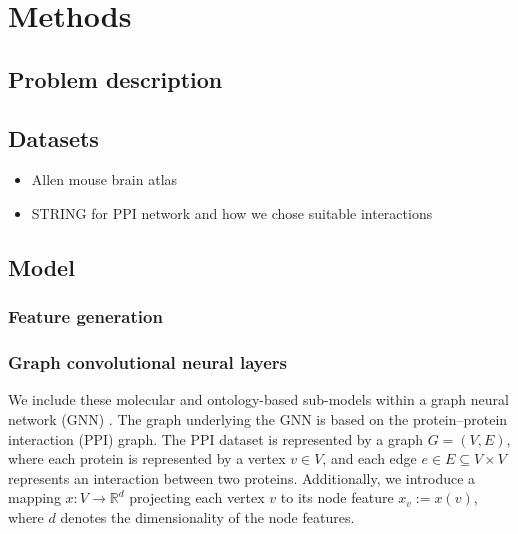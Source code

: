 \documentclass[]{article}
\renewcommand{\cite}{\citep}
\begin{document}
\section{Methods}
\subsection{Problem description}

\subsection{Datasets}
\begin{itemize}
	\item Allen mouse brain atlas \cite{MouseBrainAtlas}
	\item STRING for PPI network and how we chose suitable interactions \cite{STRINGv10}
\end{itemize}

\subsection{Model}

\subsubsection{Feature generation}

\subsubsection{Graph convolutional neural layers}

We include these molecular and ontology-based sub-models within a
graph neural network (GNN) \cite{GCNConv}. The graph underlying the GNN is
based on the protein--protein interaction (PPI) graph. The PPI dataset
is represented by a graph $G=(V,E)$, where each protein is represented
by a vertex $v\in V$, and each edge $e\in E\subseteq V\times V$
represents an interaction between two proteins. Additionally, we
introduce a mapping $x:V\rightarrow\mathbb{R}^{d}$ projecting each
vertex $v$ to its node feature $x_v := x(v)$, where $d$ denotes the
dimensionality of the node features.
\end{document}
